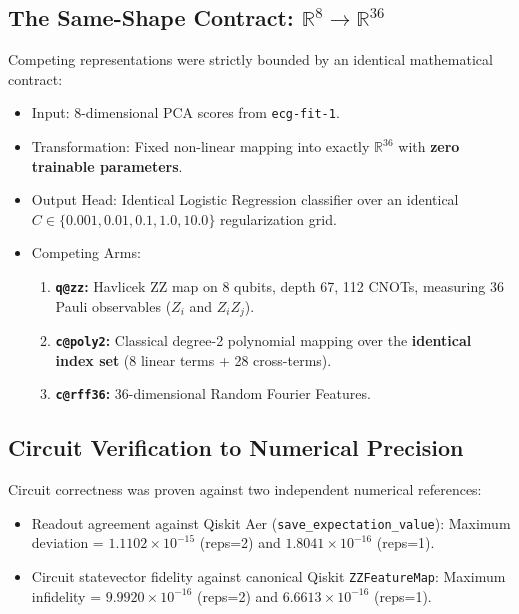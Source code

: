 \documentclass[11pt,a4paper]{report}
\begin{document}
\subsection{The Same-Shape Contract: $\mathbb{R}^8 \to \mathbb{R}^{36}$}
Competing representations were strictly bounded by an identical mathematical contract:
\begin{itemize}
  \item Input: 8-dimensional PCA scores from \texttt{ecg-fit-1}.
  \item Transformation: Fixed non-linear mapping into exactly $\mathbb{R}^{36}$ with \textbf{zero trainable parameters}.
  \item Output Head: Identical Logistic Regression classifier over an identical $C \in \{0.001, 0.01, 0.1, 1.0, 10.0\}$ regularization grid.
  \item Competing Arms:
    \begin{enumerate}
      \item \textbf{\texttt{q@zz}:} Havlicek ZZ map on 8 qubits, depth 67, 112 CNOTs, measuring 36 Pauli observables ($Z_i$ and $Z_i Z_j$).
      \item \textbf{\texttt{c@poly2}:} Classical degree-2 polynomial mapping over the \textbf{identical index set} (8 linear terms + 28 cross-terms).
      \item \textbf{\texttt{c@rff36}:} 36-dimensional Random Fourier Features.
    \end{enumerate}
\end{itemize}

\subsection{Circuit Verification to Numerical Precision}
Circuit correctness was proven against two independent numerical references:
\begin{itemize}
  \item Readout agreement against Qiskit Aer (\texttt{save\_expectation\_value}): Maximum deviation = \textbf{$1.1102 \times 10^{-15}$} (reps=2) and \textbf{$1.8041 \times 10^{-16}$} (reps=1).
  \item Circuit statevector fidelity against canonical Qiskit \texttt{ZZFeatureMap}: Maximum infidelity = \textbf{$9.9920 \times 10^{-16}$} (reps=2) and \textbf{$6.6613 \times 10^{-16}$} (reps=1).
\end{itemize}
\end{document}
